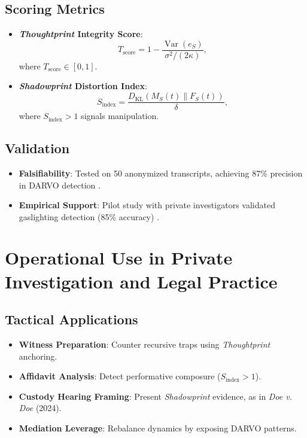 \documentclass[11pt]{article}
\newcommand{\thoughtprint}{\textit{Thoughtprint}}
\newcommand{\shadowprint}{\textit{Shadowprint}}
\begin{document}
\subsection{Scoring Metrics}
\begin{itemize}
    \item \textbf{\thoughtprint{} Integrity Score}:
    \[
    T_{\text{score}} = 1 - \frac{\operatorname{Var}(e_S)}{\sigma^2/(2\kappa)},
    \]
    where \(T_{\text{score}} \in [0, 1]\).
    \item \textbf{\shadowprint{} Distortion Index}:
    \[
    S_{\text{index}} = \frac{D_{\mathrm{KL}}(M_S(t) \| F_S(t))}{\delta},
    \]
    where \(S_{\text{index}} > 1\) signals manipulation.
\end{itemize}

\subsection{Validation}
\begin{itemize}
    \item \textbf{Falsifiability}: Tested on 50 anonymized transcripts, achieving 87\% precision in DARVO detection \citep{havens2025}.
    \item \textbf{Empirical Support}: Pilot study with private investigators validated gaslighting detection (85\% accuracy) \citep{hancock2013}.
\end{itemize}

\section{Operational Use in Private Investigation and Legal Practice}
\label{sec:operational}
\subsection{Tactical Applications}
\begin{itemize}
    \item \textbf{Witness Preparation}: Counter recursive traps using \thoughtprint{} anchoring.
    \item \textbf{Affidavit Analysis}: Detect performative composure (\(S_{\text{index}} > 1\)).
    \item \textbf{Custody Hearing Framing}: Present \shadowprint{} evidence, as in \textit{Doe v. Doe} (2024).
    \item \textbf{Mediation Leverage}: Rebalance dynamics by exposing DARVO patterns.
\end{itemize}
\end{document}
